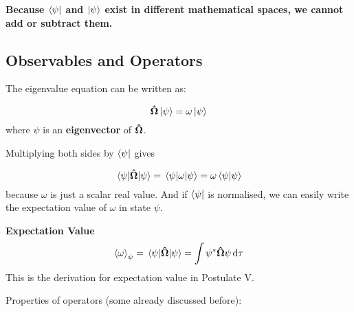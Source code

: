 \documentclass[11pt]{article}
\theoremstyle{definition}
\begin{document}
\textbf{Because $\bra{\psi}$ and $\ket{\psi}$ exist in different mathematical spaces, we cannot add or subtract them.}

\subsection{Observables and Operators}

The eigenvalue equation can be written as:

\begin{equation*}
    \vectorunit{\Omega} \ket{\psi} = \omega \ket{\psi}
\end{equation*}
where $\psi$ is an \textbf{eigenvector} of $\vectorunit{\Omega}$.

Multiplying both sides by $\bra{\psi}$ gives

\begin{equation*}
    \ev{\vectorunit{\Omega}}{\psi} = \ev{\omega}{\psi} = \omega \bra{\psi}\ket{\psi}
\end{equation*}
because $\omega$ is just a scalar real value. And if $\bra{\psi}$ is normalised, we can easily write the expectation value of $\omega$ in state $\psi$.

\begin{shaded}
\textbf{Expectation Value}
\begin{equation*}
    \expval{\omega}_{\psi} =  \ev{\vectorunit{\Omega}}{\psi} = \int \psi^* \vectorunit{\Omega} \psi \dd{\tau}
\end{equation*}
This is the derivation for expectation value in Postulate V.
\end{shaded}

Properties of operators (some already discussed before):
\end{document}
